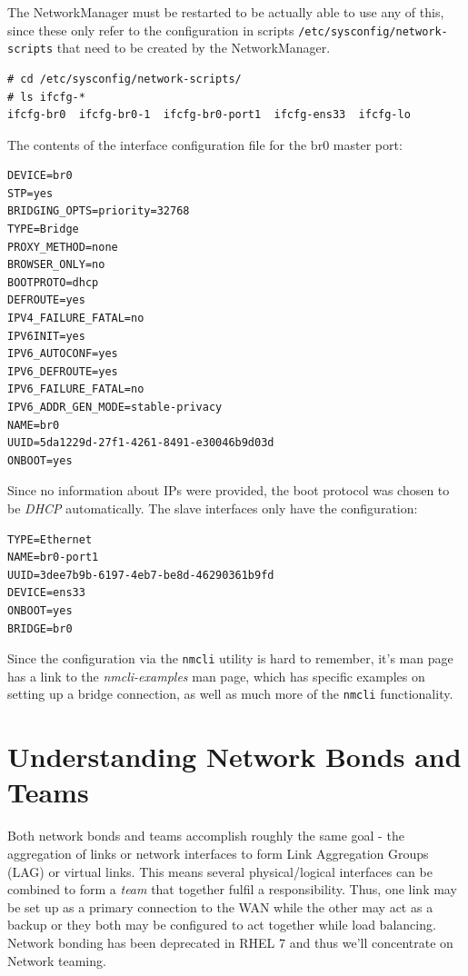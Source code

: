 \noindent
The NetworkManager must be restarted to be actually able to use any of this, since these only refer to the configuration in scripts \verb|/etc/sysconfig/network-scripts| that need to be created by the NetworkManager. 

\vspace{-15pt}
\begin{verbatim}
# cd /etc/sysconfig/network-scripts/
# ls ifcfg-*
ifcfg-br0  ifcfg-br0-1  ifcfg-br0-port1  ifcfg-ens33  ifcfg-lo
\end{verbatim}
\vspace{-10pt}	

\noindent
The contents of the interface configuration file for the br0 master port:

\vspace{-15pt}
\begin{verbatim}
DEVICE=br0
STP=yes
BRIDGING_OPTS=priority=32768
TYPE=Bridge
PROXY_METHOD=none
BROWSER_ONLY=no
BOOTPROTO=dhcp
DEFROUTE=yes
IPV4_FAILURE_FATAL=no
IPV6INIT=yes
IPV6_AUTOCONF=yes
IPV6_DEFROUTE=yes
IPV6_FAILURE_FATAL=no
IPV6_ADDR_GEN_MODE=stable-privacy
NAME=br0
UUID=5da1229d-27f1-4261-8491-e30046b9d03d
ONBOOT=yes
\end{verbatim}
\vspace{-10pt}	

\noindent
Since no information about IPs were provided, the boot protocol was chosen to be \textit{DHCP} automatically. The slave interfaces only have the configuration:

\vspace{-15pt}
\begin{verbatim}
TYPE=Ethernet
NAME=br0-port1
UUID=3dee7b9b-6197-4eb7-be8d-46290361b9fd
DEVICE=ens33
ONBOOT=yes
BRIDGE=br0
\end{verbatim}
\vspace{-10pt}	

\noindent
Since the configuration via the \verb|nmcli| utility is hard to remember, it's man page has a link to the \textit{nmcli-examples} man page, which has specific examples on setting up a bridge connection, as well as much more of the \verb|nmcli| functionality. 

	\section{Understanding Network Bonds and Teams}
Both network bonds and teams accomplish roughly the same goal - the aggregation of links or network interfaces to form Link Aggregation Groups (LAG) or virtual links. This means several physical/logical interfaces can be combined to form a \textit{team} that together fulfil a responsibility. Thus, one link may be set up as a primary connection to the WAN while the other may act as a backup or they both may be configured to act together while load balancing. Network bonding has been deprecated in RHEL 7 and thus we'll concentrate on Network teaming. 

